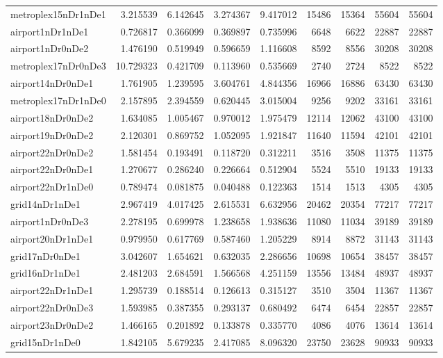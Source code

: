 \begin{longtable}{|l|r|r|r|r|r|r|r|r|}
metroplex15nDr1nDe1 & 3.215539 & 6.142645 & 3.274367 & 9.417012 & 15486 & 15364 & 55604 & 55604 \\
airport1nDr1nDe1 & 0.726817 & 0.366099 & 0.369897 & 0.735996 & 6648 & 6622 & 22887 & 22887 \\
airport1nDr0nDe2 & 1.476190 & 0.519949 & 0.596659 & 1.116608 & 8592 & 8556 & 30208 & 30208 \\
metroplex17nDr0nDe3 & 10.729323 & 0.421709 & 0.113960 & 0.535669 & 2740 & 2724 & 8522 & 8522 \\
airport14nDr0nDe1 & 1.761905 & 1.239595 & 3.604761 & 4.844356 & 16966 & 16886 & 63430 & 63430 \\
metroplex17nDr1nDe0 & 2.157895 & 2.394559 & 0.620445 & 3.015004 & 9256 & 9202 & 33161 & 33161 \\
airport18nDr0nDe2 & 1.634085 & 1.005467 & 0.970012 & 1.975479 & 12114 & 12062 & 43100 & 43100 \\
airport19nDr0nDe2 & 2.120301 & 0.869752 & 1.052095 & 1.921847 & 11640 & 11594 & 42101 & 42101 \\
airport22nDr0nDe2 & 1.581454 & 0.193491 & 0.118720 & 0.312211 & 3516 & 3508 & 11375 & 11375 \\
airport22nDr0nDe1 & 1.270677 & 0.286240 & 0.226664 & 0.512904 & 5524 & 5510 & 19133 & 19133 \\
airport22nDr1nDe0 & 0.789474 & 0.081875 & 0.040488 & 0.122363 & 1514 & 1513 & 4305 & 4305 \\
grid14nDr1nDe1 & 2.967419 & 4.017425 & 2.615531 & 6.632956 & 20462 & 20354 & 77217 & 77217 \\
airport1nDr0nDe3 & 2.278195 & 0.699978 & 1.238658 & 1.938636 & 11080 & 11034 & 39189 & 39189 \\
airport20nDr1nDe1 & 0.979950 & 0.617769 & 0.587460 & 1.205229 & 8914 & 8872 & 31143 & 31143 \\
grid17nDr0nDe1 & 3.042607 & 1.654621 & 0.632035 & 2.286656 & 10698 & 10654 & 38457 & 38457 \\
grid16nDr1nDe1 & 2.481203 & 2.684591 & 1.566568 & 4.251159 & 13556 & 13484 & 48937 & 48937 \\
airport22nDr1nDe1 & 1.295739 & 0.188514 & 0.126613 & 0.315127 & 3510 & 3504 & 11367 & 11367 \\
airport22nDr0nDe3 & 1.593985 & 0.387355 & 0.293137 & 0.680492 & 6474 & 6454 & 22857 & 22857 \\
airport23nDr0nDe2 & 1.466165 & 0.201892 & 0.133878 & 0.335770 & 4086 & 4076 & 13614 & 13614 \\
grid15nDr1nDe0 & 1.842105 & 5.679235 & 2.417085 & 8.096320 & 23750 & 23628 & 90933 & 90933 \\

\end{longtable}
